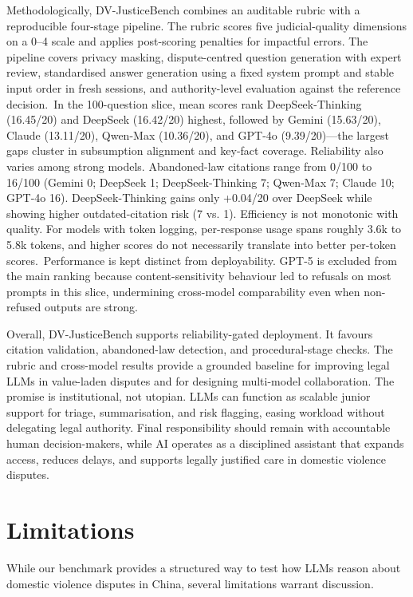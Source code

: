 \documentclass[pdflatex,sn-mathphys-ay]{sn-jnl}%
\theoremstyle{thmstyleone}%
\theoremstyle{thmstyletwo}%
\theoremstyle{thmstylethree}%
\begin{document}
Methodologically, DV-JusticeBench combines an auditable rubric with a reproducible four-stage pipeline. The rubric scores five judicial-quality dimensions on a 0--4 scale and applies post-scoring penalties for impactful errors. The pipeline covers privacy masking, dispute-centred question generation with expert review, standardised answer generation using a fixed system prompt and stable input order in fresh sessions, and authority-level evaluation against the reference decision.~In the 100-question slice, mean scores rank DeepSeek-Thinking (16.45/20) and DeepSeek (16.42/20) highest, followed by Gemini (15.63/20), Claude (13.11/20), Qwen-Max (10.36/20), and GPT-4o (9.39/20)---the largest gaps cluster in subsumption alignment and key-fact coverage. Reliability also varies among strong models. Abandoned-law citations range from 0/100 to 16/100 (Gemini 0; DeepSeek 1; DeepSeek-Thinking 7; Qwen-Max 7; Claude 10; GPT-4o 16). DeepSeek-Thinking gains only +0.04/20 over DeepSeek while showing higher outdated-citation risk (7 vs. 1). Efficiency is not monotonic with quality. For models with token logging, per-response usage spans roughly 3.6k to 5.8k tokens, and higher scores do not necessarily translate into better per-token scores.~Performance is kept distinct from deployability. GPT-5 is excluded from the main ranking because content-sensitivity behaviour led to refusals on most prompts in this slice, undermining cross-model comparability even when non-refused outputs are strong.

Overall, DV-JusticeBench supports reliability-gated deployment. It favours citation validation, abandoned-law detection, and procedural-stage checks. The rubric and cross-model results provide a grounded baseline for improving legal LLMs in value-laden disputes and for designing multi-model collaboration. The promise is institutional, not utopian. LLMs can function as scalable junior support for triage, summarisation, and risk flagging, easing workload without delegating legal authority. Final responsibility should remain with accountable human decision-makers, while AI operates as a disciplined assistant that expands access, reduces delays, and supports legally justified care in domestic violence disputes.

\section{Limitations}\label{sec7}

While our benchmark provides a structured way to test how LLMs reason about domestic violence disputes in China, several limitations warrant discussion.
\end{document}
